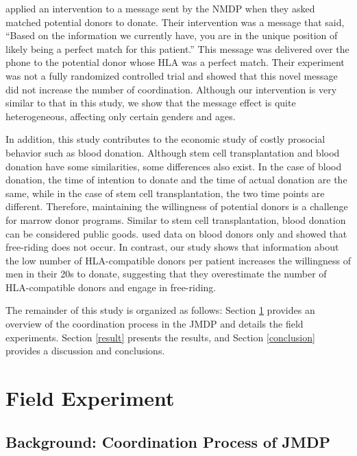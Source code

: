 \documentclass[
  11pt,
  a4paper
]{article}
\begin{document}
\citet{Switzer2018} applied an intervention to a message sent by the NMDP when they asked matched potential donors to donate. Their intervention was a message that said, ``Based on the information we currently have, you are in the unique position of likely being a perfect match for this patient.'' This message was delivered over the phone to the potential donor whose HLA was a perfect match. Their experiment was not a fully randomized controlled trial and showed that this novel message did not increase the number of coordination. Although our intervention is very similar to that in this study, we show that the message effect is quite heterogeneous, affecting only certain genders and ages.

In addition, this study contributes to the economic study of costly prosocial behavior such as blood donation. Although stem cell transplantation and blood donation have some similarities, some differences also exist. In the case of blood donation, the time of intention to donate and the time of actual donation are the same, while in the case of stem cell transplantation, the two time points are different. Therefore, maintaining the willingness of potential donors is a challenge for marrow donor programs. Similar to stem cell transplantation, blood donation can be considered public goods. \citet{Wildman2009} used data on blood donors only and showed that free-riding does not occur. In contrast, our study shows that information about the low number of HLA-compatible donors per patient increases the willingness of men in their 20s to donate, suggesting that they overestimate the number of HLA-compatible donors and engage in free-riding.

The remainder of this study is organized as follows: Section \ref{experiment} provides an overview of the coordination process in the JMDP and details the field experiments. Section \ref{result} presents the results, and Section \ref{conclusion} provides a discussion and conclusions.

\hypertarget{experiment}{%
\section{Field Experiment}\label{experiment}}

\hypertarget{background}{%
\subsection{Background: Coordination Process of JMDP}\label{background}}
\end{document}
